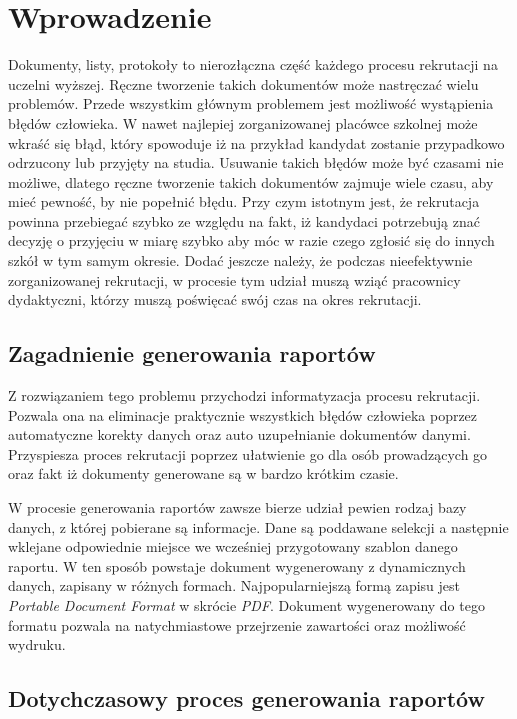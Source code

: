 \chapter{Wprowadzenie}

Dokumenty, listy, protokoły to nierozłączna część każdego procesu rekrutacji na uczelni wyższej. Ręczne tworzenie takich dokumentów może nastręczać wielu problemów. Przede wszystkim głównym problemem jest możliwość wystąpienia błędów człowieka. W nawet najlepiej zorganizowanej placówce szkolnej może wkraść się błąd, który spowoduje iż na przykład kandydat zostanie przypadkowo odrzucony lub przyjęty na studia. Usuwanie takich błędów może być czasami nie możliwe, dlatego ręczne tworzenie takich dokumentów zajmuje wiele czasu, aby mieć pewność, by nie popełnić błędu. Przy czym istotnym jest, że rekrutacja powinna przebiegać szybko ze względu na fakt, iż kandydaci potrzebują znać decyzję o przyjęciu w miarę szybko aby móc w razie czego zgłosić się do innych szkół w tym samym okresie. Dodać jeszcze należy, że podczas nieefektywnie zorganizowanej rekrutacji, w procesie tym udział muszą wziąć pracownicy dydaktyczni, którzy muszą poświęcać swój czas na okres rekrutacji.


\section{ Zagadnienie generowania raportów}

Z rozwiązaniem tego problemu przychodzi informatyzacja procesu rekrutacji. Pozwala ona na eliminacje praktycznie wszystkich błędów człowieka poprzez automatyczne korekty danych oraz auto uzupełnianie dokumentów danymi. Przyspiesza proces rekrutacji poprzez ułatwienie go dla osób prowadzących go oraz fakt iż dokumenty generowane są w bardzo krótkim czasie. 
\par
W procesie generowania raportów zawsze bierze udział pewien rodzaj bazy danych, z której pobierane są informacje. Dane są poddawane selekcji a następnie wklejane odpowiednie miejsce we wcześniej przygotowany szablon danego raportu. W ten sposób powstaje dokument wygenerowany z dynamicznych danych, zapisany w różnych formach. Najpopularniejszą formą zapisu jest \emph{Portable Document Format} w skrócie \emph{PDF}. Dokument wygenerowany do tego formatu pozwala na natychmiastowe przejrzenie zawartości oraz możliwość wydruku.


\section{ Dotychczasowy proces generowania raportów}

